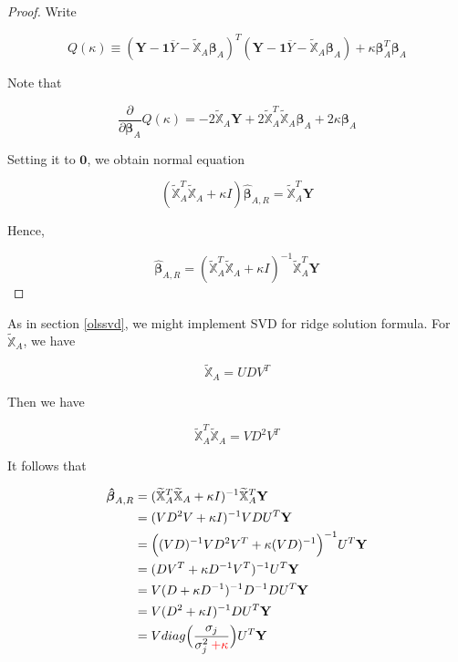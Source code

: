 \documentclass[]{book}
\theoremstyle{definition}
\theoremstyle{definition}
\theoremstyle{definition}
\theoremstyle{remark}
\let\BeginKnitrBlock\begin \let\EndKnitrBlock\end
\begin{document}
\BeginKnitrBlock{proof}
{}Write

\[Q(\kappa) \equiv (\mathbf{Y} - \mathbf{1} \overline{Y} - \widetilde{\mathbb{X}}_A \boldsymbol\beta_A)^T (\mathbf{Y} - \mathbf{1} \overline{Y} - \widetilde{\mathbb{X}}_A \boldsymbol\beta_A) + \kappa \boldsymbol\beta_A^T \boldsymbol\beta_A\]

Note that

\[
\frac{\partial}{\partial \boldsymbol\beta_A} Q(\kappa) = -2 \widetilde{\mathbb{X}}_A \mathbf{Y} + 2 \widetilde{\mathbb{X}}_A^T \widetilde{\mathbb{X}}_A \boldsymbol\beta_A + 2 \kappa \boldsymbol\beta_A
\]

Setting it to \(\mathbf{0}\), we obtain normal equation

\begin{equation}
  (\widetilde{\mathbb{X}}_A^T \widetilde{\mathbb{X}}_A + \kappa I) \boldsymbol{\hat\beta}_{A, R} = \widetilde{\mathbb{X}}_A^T \mathbf{Y}
  \label{eq:ridgenormal}
\end{equation}

Hence,

\[\boldsymbol{\hat\beta}_{A, R} = (\widetilde{\mathbb{X}}_A^T \widetilde{\mathbb{X}}_A + \kappa I)^{-1}\widetilde{\mathbb{X}}_A^T \mathbf{Y}\]
\EndKnitrBlock{proof}

As in section \ref{olssvd}, we might implement SVD for ridge solution formula. For \(\widetilde{\mathbb{X}}_A\), we have

\[\widetilde{\mathbb{X}}_A = UDV^T\]

Then we have

\[\widetilde{\mathbb{X}}_A^T \widetilde{\mathbb{X}}_A = VD^2 V^T\]

It follows that

\begin{equation}
  \begin{split}
    \boldsymbol{\hat\beta}_{A, R} & = (\widetilde{\mathbb{X}}_A^T \widetilde{\mathbb{X}}_A + \kappa I)^{-1}\widetilde{\mathbb{X}}_A^T \mathbf{Y} \\
    & = (VD^2V + \kappa I)^{-1} VDU^T \mathbf{Y} \\
    & = \Big( (VD)^{-1} VD^2 V^T + \kappa (VD)^{-1} \Big)^{-1} U^T \mathbf{Y} \\
    & = (DV^T + \kappa D^{-1}V^T)^{-1} U^T \mathbf{Y} \\
    & = V ( D + \kappa D^{-1})^{-1} D^{-1}D U^T \mathbf{Y} \\
    & = V ( D^2 + \kappa I)^{-1} D U^T \mathbf{Y} \\
    & = V diag\Big( \frac{\sigma_j}{\sigma_j^2 \: {\color{red}{+ \kappa}}} \Big) U^T \mathbf{Y}
  \end{split}
  \label{eq:ridgesvd}
\end{equation}
\end{document}
